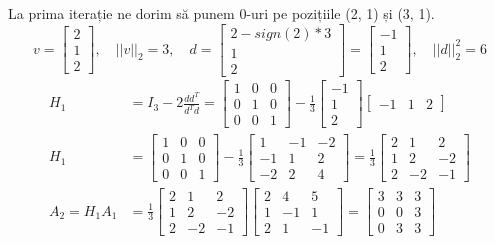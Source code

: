 \documentclass{exam}
\begin{document}
La prima iterație ne dorim să punem 0-uri pe pozițiile (2, 1) și (3, 1).
\begin{equation*}
	v = \begin{bmatrix} 2 \\ 1 \\ 2 \end{bmatrix}, \quad ||v||_2 = 3, \quad d = \begin{bmatrix} 2 -sign(2) * 3 \\ 1 \\ 2 \end{bmatrix} = \begin{bmatrix} -1 \\ 1 \\ 2 \end{bmatrix}, \quad ||d||_2^2 = 6
\end{equation*}
\begin{align*}
	H_1           & = I_3 - 2 \frac{d d^T}{d^T d} = \begin{bmatrix} 1 & 0 & 0 \\ 0 & 1 & 0 \\ 0 & 0 & 1 \end{bmatrix} - \frac{1}{3} \begin{bmatrix} -1 \\ 1 \\ 2 \end{bmatrix} \begin{bmatrix} -1 & 1 & 2 \end{bmatrix}                                        \\
	H_1           & = \begin{bmatrix} 1 & 0 & 0 \\ 0 & 1 & 0 \\ 0 & 0 & 1 \end{bmatrix} - \frac{1}{3} \begin{bmatrix} 1 & -1 & -2 \\ -1 & 1 & 2 \\ -2 & 2 & 4 \end{bmatrix} = \frac{1}{3} \begin{bmatrix} 2 & 1 & 2 \\ 1 & 2 & -2 \\ 2 & -2 & -1 \end{bmatrix} \\
	A_2 = H_1 A_1 & = \frac{1}{3} \begin{bmatrix} 2 & 1 & 2 \\ 1 & 2 & -2 \\ 2 & -2 & -1 \end{bmatrix} \begin{bmatrix} 2 & 4 & 5 \\ 1 & -1 & 1 \\ 2 & 1 & -1 \end{bmatrix} = \begin{bmatrix} 3 & 3 & 3 \\ 0 & 0 & 3 \\ 0 & 3 & 3 \end{bmatrix}
\end{align*}
\end{document}
